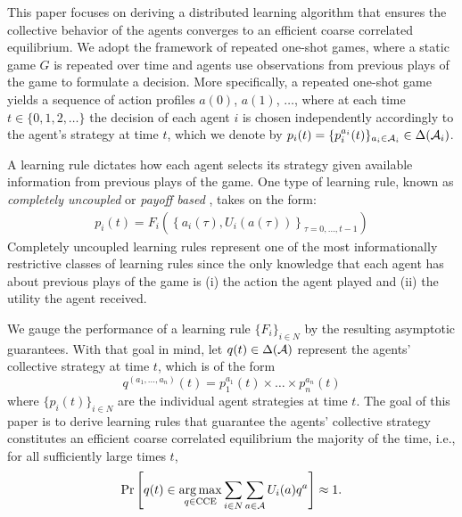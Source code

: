 This paper focuses on deriving a distributed learning algorithm that ensures the collective behavior of the agents converges to an efficient coarse correlated equilibrium. We adopt the framework of repeated one-shot games, where a static game $G$ is repeated over time and agents use observations from previous plays of the game to formulate a decision.  More specifically, a repeated one-shot game yields  a sequence of action profiles $a(0)$, $a(1)$, $\dots$, where at each time $t \in \{0,1,2, \dots\}$ the decision of each agent $i$ is chosen independently accordingly to the agent's strategy at time $t$, which we denote by $p_i(t) = \{p_i^{a_i}(t)\}_{a_i \in {\cal A}_i} \in \Delta({\cal A}_i)$.  


A learning rule dictates how each agent selects its strategy given available information from previous plays of the game. One type of learning rule, known as \emph{completely uncoupled} or \emph{payoff based} \cite{Foster2006}, takes on the form:
%
\begin{eqnarray}\label{eq:231}
p_i(t) = F_i\left(\left\{a_i(\tau), U_i(a(\tau))\right\}_{\tau = 0, \dots, t-1} \right)
\end{eqnarray}
%
Completely uncoupled learning rules represent one of the most informationally restrictive classes of learning rules since the only knowledge that each agent has about previous plays of the game is (i) the action the agent played and (ii) the utility the agent received. %

We gauge the performance of a learning rule $\{F_i\}_{i\in N}$ by the resulting asymptotic guarantees.  With that goal in mind, let $q(t) \in \Delta({\cal A})$ represent the agents' collective strategy at time $t$, which is of the form
%
\begin{equation}\label{eq:123}
q^{(a_1, \dots, a_n)}(t) = p_1^{a_1}(t) \times \dots \times p_n^{a_n}(t) 
\end{equation}
%
where $\{p_i(t)\}_{i \in N}$ are the individual agent strategies at time $t$. The goal of this paper is to derive learning rules that guarantee the agents' collective strategy constitutes an efficient coarse correlated equilibrium the majority of the time, i.e., for all sufficiently large times $t$, 
%
\begin{equation}
{\rm Pr}\left[ q(t) \in \underset{q \in {\rm CCE}}{\arg \max} \sum_{i \in N} \sum_{a \in {\cal A}} U_i(a) q^a \right] \approx 1.  
\end{equation}
%

